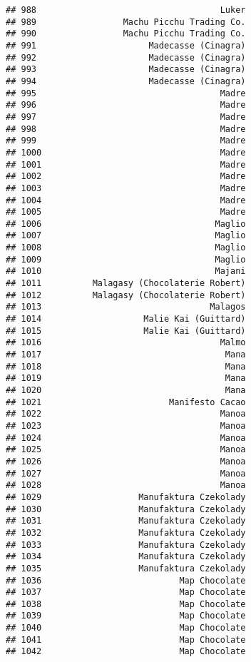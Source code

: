 \documentclass[
]{article}
\begin{document}
\begin{verbatim}
## 988                                    Luker
## 989                 Machu Picchu Trading Co.
## 990                 Machu Picchu Trading Co.
## 991                      Madecasse (Cinagra)
## 992                      Madecasse (Cinagra)
## 993                      Madecasse (Cinagra)
## 994                      Madecasse (Cinagra)
## 995                                    Madre
## 996                                    Madre
## 997                                    Madre
## 998                                    Madre
## 999                                    Madre
## 1000                                   Madre
## 1001                                   Madre
## 1002                                   Madre
## 1003                                   Madre
## 1004                                   Madre
## 1005                                   Madre
## 1006                                  Maglio
## 1007                                  Maglio
## 1008                                  Maglio
## 1009                                  Maglio
## 1010                                  Majani
## 1011          Malagasy (Chocolaterie Robert)
## 1012          Malagasy (Chocolaterie Robert)
## 1013                                 Malagos
## 1014                    Malie Kai (Guittard)
## 1015                    Malie Kai (Guittard)
## 1016                                   Malmo
## 1017                                    Mana
## 1018                                    Mana
## 1019                                    Mana
## 1020                                    Mana
## 1021                         Manifesto Cacao
## 1022                                   Manoa
## 1023                                   Manoa
## 1024                                   Manoa
## 1025                                   Manoa
## 1026                                   Manoa
## 1027                                   Manoa
## 1028                                   Manoa
## 1029                   Manufaktura Czekolady
## 1030                   Manufaktura Czekolady
## 1031                   Manufaktura Czekolady
## 1032                   Manufaktura Czekolady
## 1033                   Manufaktura Czekolady
## 1034                   Manufaktura Czekolady
## 1035                   Manufaktura Czekolady
## 1036                           Map Chocolate
## 1037                           Map Chocolate
## 1038                           Map Chocolate
## 1039                           Map Chocolate
## 1040                           Map Chocolate
## 1041                           Map Chocolate
## 1042                           Map Chocolate

\end{verbatim}
\end{document}
